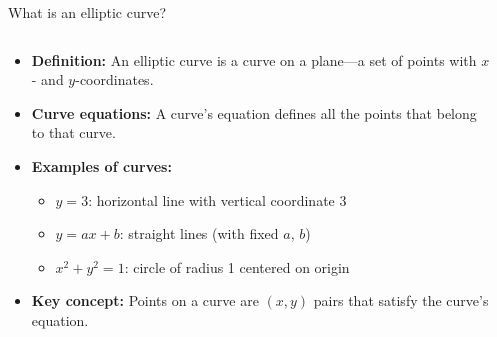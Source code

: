 \documentclass[aspectratio=169, lualatex, handout]{beamer}
\begin{document}
\begin{frame}{What is an elliptic curve?}
	\begin{columns}
		\begin{column}{0.6\textwidth}
			\begin{itemize}[<+->]
				\item \textbf{Definition:} An elliptic curve is a curve on a plane—a set of points with $x$- and $y$-coordinates.
				\item \textbf{Curve equations:} A curve's equation defines all the points that belong to that curve.
				\item \textbf{Examples of curves:}
				      \begin{itemize}[<+->]
					      \item $y = 3$: horizontal line with vertical coordinate 3
					      \item $y = ax + b$: straight lines (with fixed $a$, $b$)
					      \item $x^2 + y^2 = 1$: circle of radius 1 centered on origin
				      \end{itemize}
				\item \textbf{Key concept:} Points on a curve are $(x, y)$ pairs that satisfy the curve's equation.
			\end{itemize}
		\end{column}
		\begin{column}{0.4\textwidth}
		\end{column}
	\end{columns}
\end{frame}
\end{document}
